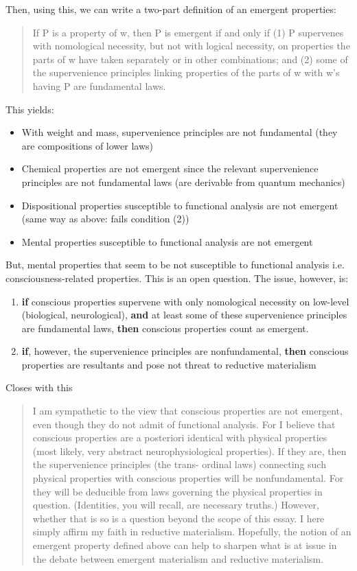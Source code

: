 \documentclass{article}
\newcommand{\tb}[1]{\textbf{#1}}
\begin{document}
Then, using this, we can write a two-part definition of an emergent properties:

\begin{quote}
If P is a property of w, then P is emergent if and only if (1) P supervenes with nomological necessity, but not with logical necessity, on properties the parts of w have taken separately or in other combinations; and (2) some of the supervenience principles linking properties of the parts of w with w's having P are fundamental laws.
\end{quote}

This yields:
\begin{itemize}
    \item With weight and mass, supervenience principles are not fundamental (they are compositions of lower laws)
    \item Chemical properties are not emergent since the relevant supervenience principles are not fundamental laws (are derivable from quantum mechanics)
    \item Dispositional properties susceptible to functional analysis are not emergent (same way as above: fails condition (2))
    \item Mental properties susceptible to functional analysis are not emergent
\end{itemize}

But, mental properties that seem to be not susceptible to functional analysis i.e. consciousness-related properties. This is an open question. The issue, however, is:
\begin{enumerate}
    \item \tb{if} conscious properties supervene with only nomological necessity on low-level (biological, neurological), \tb{and} at least some of these supervenience principles are fundamental laws, \tb{then} conscious properties count as emergent.
    \item \tb{if}, however, the supervenience principles are nonfundamental, \tb{then} conscious properties are resultants and pose not threat to reductive materialism
\end{enumerate}

Closes with this

\begin{quote}
I am sympathetic to the view that conscious properties are not emergent, even though they do not admit of functional analysis. For I believe that conscious properties are a posteriori identical with physical properties (most likely, very abstract neurophysiological properties). If they are, then the supervenience principles (the trans- ordinal laws) connecting such physical properties with conscious properties will be nonfundamental. For they will be deducible from laws governing the physical properties in question. (Identities, you will recall, are necessary truths.) However, whether that is so is a question beyond the scope of this essay. I here simply affirm my faith in reductive materialism. Hopefully, the notion of an emergent property defined above can help to sharpen what is at issue in the debate between emergent materialism and reductive materialism.
\end{quote}
\end{document}
